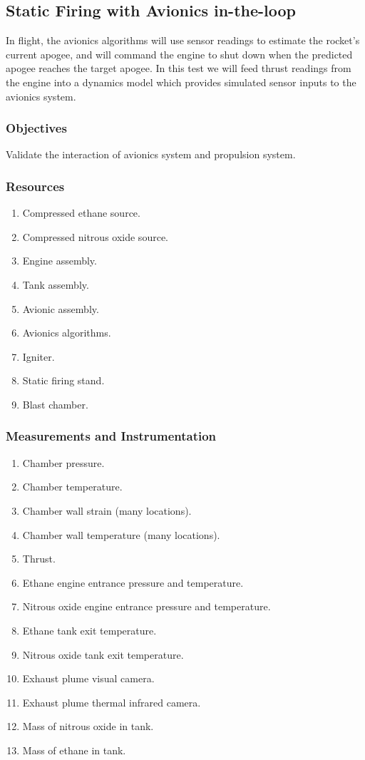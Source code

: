\documentclass{article}
\begin{document}
\subsection{Static Firing with Avionics in-the-loop}
In flight, the avionics algorithms will use sensor readings to estimate the rocket's current apogee, and will command the engine to shut down when the predicted apogee reaches the target apogee.
In this test we will feed thrust readings from the engine into a dynamics model which provides simulated sensor inputs to the avionics system. 
\subsubsection{Objectives}
Validate the interaction of avionics system and propulsion system.
\subsubsection{Resources}
\begin{enumerate}
\item Compressed ethane source.
\item Compressed nitrous oxide source.
\item Engine assembly.
\item Tank assembly.
\item Avionic assembly.
\item Avionics algorithms.
\item Igniter.
\item Static firing stand.
\item Blast chamber.
\end{enumerate}
\subsubsection{Measurements and Instrumentation}
\begin{enumerate}
\item Chamber pressure.
\item Chamber temperature.
\item Chamber wall strain (many locations).
\item Chamber wall temperature (many locations).
\item Thrust.
\item Ethane engine entrance pressure and temperature.
\item Nitrous oxide engine entrance pressure and temperature.
\item Ethane tank exit temperature.
\item Nitrous oxide tank exit temperature.
\item Exhaust plume visual camera.
\item Exhaust plume thermal infrared camera.
\item Mass of nitrous oxide in tank. %
\item Mass of ethane in tank. %
\end{enumerate}
\end{document}
